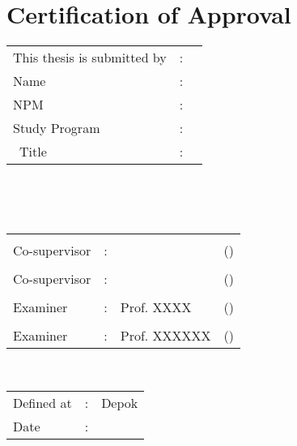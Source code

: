 %
%
%

\chapter*{Certification of Approval}

\vspace*{0.4cm}
\noindent 

\noindent
\begin{tabular}{ll p{9cm}}
	This thesis is submitted by&: & \\
	Name&: & \penulis \\
	NPM&: & \npm \\
	Study Program&: & \program \\
	\type~Title&: & \judul \\
\end{tabular} \\

\vspace*{1.0cm}

\noindent {}\\[0.2cm]

\begin{center}
\end{center}

\vspace*{0.3cm}

\begin{tabular}{l l l l }
	& & & \\
	Co-supervisor&: & \pembimbing & (\hspace*{3.0cm}) \\
	& & & \\
	Co-supervisor&: & \pembimbingDua & (\hspace*{3.0cm}) \\
	& & & \\
	Examiner&: & Prof. XXXX & (\hspace*{3.0cm}) \\
	& & & \\
	Examiner&: & Prof. XXXXXX & (\hspace*{3.0cm}) \\
\end{tabular}\\


\vspace*{2.0cm}

\begin{tabular}{ll l}
	Defined at&: & Depok\\
	Date&: & \tanggalLulus \\
\end{tabular}


\newpage